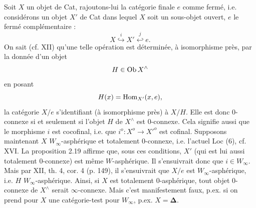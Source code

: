 Soit $X$ un objet de Cat, rajoutons-lui la catégorie finale $e$ comme fermé, i.e. considérons un objet $X'$ de Cat dans lequel $X$ soit un sous-objet ouvert, $e$ le fermé complémentaire :
\[
X \overset{i}{\hookrightarrow} X' \overset{j}{\hookleftarrow} e.
\]
On sait (cf. XII) qu'une telle opération est déterminée, à isomorphisme près, par la donnée d'un objet
\[
H \in \operatorname{Ob} X^\wedge
\]
en posant
\[
H(x) = \operatorname{Hom}_{X'}(x,e),
\]
la catégorie $X/e$ s'identifiant (à isomorphisme près) à $X/H$. Elle est donc 0-connexe si et seulement si l'objet $H$ de $X^\wedge$ est 0-connexe. Cela signifie aussi que le morphisme $i$ est cocofinal, i.e. que $i^o : X^o \longrightarrow X'^o$ est cofinal. Supposons maintenant $X$ $W_\infty$-asphérique et totalement 0-connexe, i.e. l'actuel Loc (6), cf. XVI. La proposition 2.19 affirme que, sous ces conditions, $X'$ (qui est lui aussi totalement 0-connexe) est même $W$-asphérique. Il s'ensuivrait donc que $i \in W_\infty$. Mais par XII, th. 4, cor. 4 (p. 149), il s'ensuivrait que
$X/e$ est $W_\infty$-asphérique, i.e. $H$ $W_\infty$-asphérique. Ainsi, si $X$ est totalement 0-asphérique, tout objet 0-connexe de $X^\wedge$ serait $\infty$-connexe. Mais c'est manifestement faux, p.ex. si on prend pour $X$ une catégorie-test pour $W_\infty$, p.ex. $X = \boldsymbol{\Delta}$.


